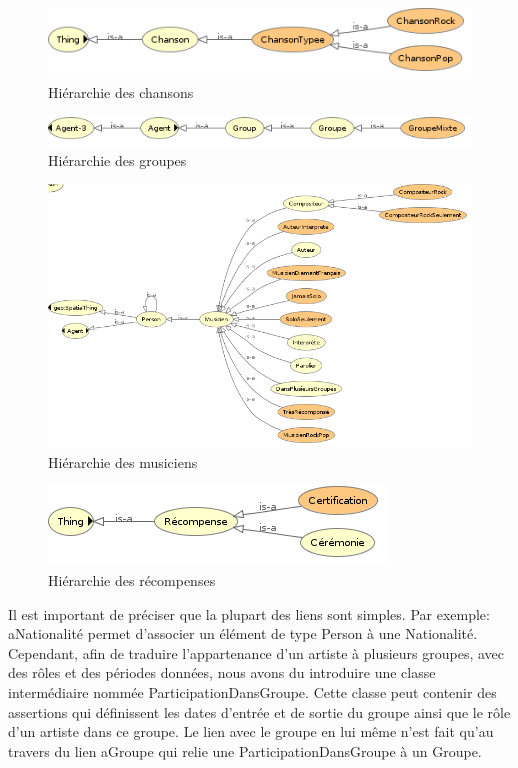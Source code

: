 \documentclass{article}
\begin{document}
\begin{figure}[H]
    \center
    \includegraphics[scale=.5]{img/chanson.png}
    \caption{Hiérarchie des chansons}
\end{figure}

\begin{figure}[H]
    \center
    \includegraphics[scale=.5]{img/groupe.png}
    \caption{Hiérarchie des groupes}
\end{figure}

\begin{figure}[H]
    \center
    \includegraphics[scale=.5]{img/musicien.png}
    \caption{Hiérarchie des musiciens}
\end{figure}

\begin{figure}[H]
    \center
    \includegraphics[scale=.5]{img/recompense.png}
    \caption{Hiérarchie des récompenses}
\end{figure}

Il est important de préciser que la plupart des liens sont simples. Par exemple: \textsf{aNationalité} permet d'associer un élément de type \textsf{Person} à une \textsf{Nationalité}. Cependant, afin de traduire l'appartenance d'un artiste à plusieurs groupes, avec des rôles et des périodes données, nous avons du introduire une classe intermédiaire nommée \textsf{ParticipationDansGroupe}. Cette classe peut contenir des assertions qui définissent les dates d'entrée et de sortie du groupe ainsi que le rôle d'un artiste dans ce groupe. Le lien avec le groupe en lui même n'est fait qu'au travers du lien \textsf{aGroupe} qui relie une \textsf{ParticipationDansGroupe} à un \textsf{Groupe}.\\
\end{document}
